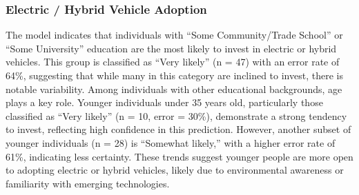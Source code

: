 \documentclass[
  letterpaper,
  DIV=11,
  numbers=noendperiod]{scrartcl}
\begin{document}
\begin{figure}


\caption{\label{fig-twenty-one}}

\end{figure}%

\subsubsection{Electric / Hybrid Vehicle
Adoption}\label{electric-hybrid-vehicle-adoption}

The model indicates that individuals with ``Some Community/Trade
School'' or ``Some University'' education are the most likely to invest
in electric or hybrid vehicles. This group is classified as ``Very
likely'' (n = 47) with an error rate of 64\%, suggesting that while many
in this category are inclined to invest, there is notable variability.
Among individuals with other educational backgrounds, age plays a key
role. Younger individuals under 35 years old, particularly those
classified as ``Very likely'' (n = 10, error = 30\%), demonstrate a
strong tendency to invest, reflecting high confidence in this
prediction. However, another subset of younger individuals (n = 28) is
``Somewhat likely,'' with a higher error rate of 61\%, indicating less
certainty. These trends suggest younger people are more open to adopting
electric or hybrid vehicles, likely due to environmental awareness or
familiarity with emerging technologies.
\end{document}
